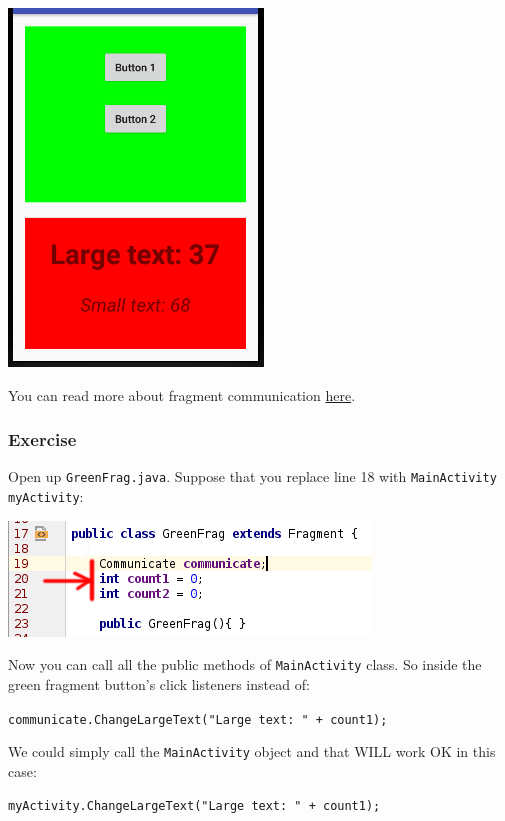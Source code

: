 \begin{center}
	\includegraphics[scale=\FigureScale]{chapters/ch11/images/36}
\end{center}

You can read more about fragment communication \href{https://developer.android.com/training/basics/fragments/communicating.html}{here}.

\subsubsection{Exercise}
Open up \texttt{GreenFrag.java}. Suppose that you replace line 18 with \texttt{MainActivity myActivity}:

\begin{center}
	\includegraphics[scale=\SourceCodeScale]{chapters/ch11/images/28}
\end{center}

Now you can call all the public methods of \texttt{MainActivity} class. So inside the green fragment button's click listeners instead of:

\texttt{communicate.ChangeLargeText("Large text: " + count1);}

We could simply call the \texttt{MainActivity} object and that WILL work OK in this case:

\texttt{myActivity.ChangeLargeText("Large text: " + count1);} \\

